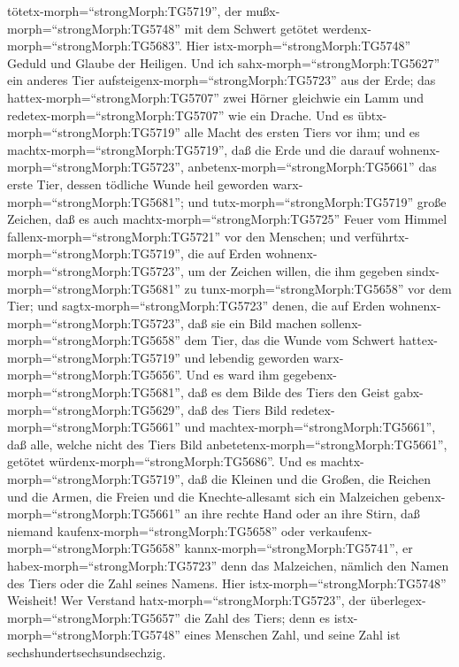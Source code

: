 tötetx-morph=``strongMorph:TG5719'', der
mußx-morph=``strongMorph:TG5748'' mit dem Schwert getötet
werdenx-morph=``strongMorph:TG5683''. Hier
istx-morph=``strongMorph:TG5748'' Geduld und Glaube der Heiligen.
 Und ich sahx-morph=``strongMorph:TG5627'' ein anderes Tier
aufsteigenx-morph=``strongMorph:TG5723'' aus der Erde; das
hattex-morph=``strongMorph:TG5707'' zwei Hörner gleichwie ein Lamm und
redetex-morph=``strongMorph:TG5707'' wie ein Drache.  Und
es übtx-morph=``strongMorph:TG5719'' alle Macht des ersten Tiers vor
ihm; und es machtx-morph=``strongMorph:TG5719'', daß die Erde und die
darauf wohnenx-morph=``strongMorph:TG5723'',
anbetenx-morph=``strongMorph:TG5661'' das erste Tier, dessen tödliche
Wunde heil geworden warx-morph=``strongMorph:TG5681'';  und
tutx-morph=``strongMorph:TG5719'' große Zeichen, daß es auch
machtx-morph=``strongMorph:TG5725'' Feuer vom Himmel
fallenx-morph=``strongMorph:TG5721'' vor den Menschen;  und
verführtx-morph=``strongMorph:TG5719'', die auf Erden
wohnenx-morph=``strongMorph:TG5723'', um der Zeichen willen, die ihm
gegeben sindx-morph=``strongMorph:TG5681'' zu
tunx-morph=``strongMorph:TG5658'' vor dem Tier; und
sagtx-morph=``strongMorph:TG5723'' denen, die auf Erden
wohnenx-morph=``strongMorph:TG5723'', daß sie ein Bild machen
sollenx-morph=``strongMorph:TG5658'' dem Tier, das die Wunde vom Schwert
hattex-morph=``strongMorph:TG5719'' und lebendig geworden
warx-morph=``strongMorph:TG5656''.  Und es ward ihm
gegebenx-morph=``strongMorph:TG5681'', daß es dem Bilde des Tiers den
Geist gabx-morph=``strongMorph:TG5629'', daß des Tiers Bild
redetex-morph=``strongMorph:TG5661'' und
machtex-morph=``strongMorph:TG5661'', daß alle, welche nicht des Tiers
Bild anbetetenx-morph=``strongMorph:TG5661'', getötet
würdenx-morph=``strongMorph:TG5686''.  Und es
machtx-morph=``strongMorph:TG5719'', daß die Kleinen und die Großen, die
Reichen und die Armen, die Freien und die Knechte-allesamt sich ein
Malzeichen gebenx-morph=``strongMorph:TG5661'' an ihre rechte Hand oder
an ihre Stirn,  daß niemand
kaufenx-morph=``strongMorph:TG5658'' oder
verkaufenx-morph=``strongMorph:TG5658''
kannx-morph=``strongMorph:TG5741'', er
habex-morph=``strongMorph:TG5723'' denn das Malzeichen, nämlich den
Namen des Tiers oder die Zahl seines Namens.  Hier
istx-morph=``strongMorph:TG5748'' Weisheit! Wer Verstand
hatx-morph=``strongMorph:TG5723'', der
überlegex-morph=``strongMorph:TG5657'' die Zahl des Tiers; denn es
istx-morph=``strongMorph:TG5748'' eines Menschen Zahl, und seine Zahl
ist sechshundertsechsundsechzig.

